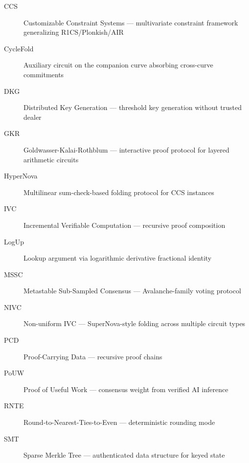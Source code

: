 \documentclass[11pt, a4paper]{article}
\begin{document}
\begin{description}
    \item[CCS] Customizable Constraint Systems --- multivariate constraint framework generalizing R1CS/Plonkish/AIR
    \item[CycleFold] Auxiliary circuit on the companion curve absorbing cross-curve commitments
    \item[DKG] Distributed Key Generation --- threshold key generation without trusted dealer
    \item[GKR] Goldwasser-Kalai-Rothblum --- interactive proof protocol for layered arithmetic circuits
    \item[HyperNova] Multilinear sum-check-based folding protocol for CCS instances
    \item[IVC] Incremental Verifiable Computation --- recursive proof composition
    \item[LogUp] Lookup argument via logarithmic derivative fractional identity
    \item[MSSC] Metastable Sub-Sampled Consensus --- Avalanche-family voting protocol
    \item[NIVC] Non-uniform IVC --- SuperNova-style folding across multiple circuit types
    \item[PCD] Proof-Carrying Data --- recursive proof chains
    \item[PoUW] Proof of Useful Work --- consensus weight from verified AI inference
    \item[RNTE] Round-to-Nearest-Ties-to-Even --- deterministic rounding mode
    \item[SMT] Sparse Merkle Tree --- authenticated data structure for keyed state
\end{description}
\end{document}
